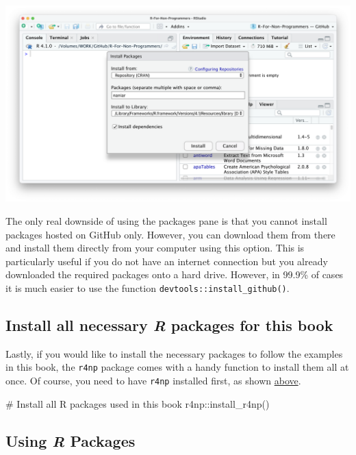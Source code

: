 \documentclass[
  letterpaper,
]{krantz}
\makeatletter
\newenvironment{Shaded}{\begin{snugshade}}{\end{snugshade}}
\newcommand{\CommentTok}[1]{\textcolor[rgb]{0.37,0.37,0.37}{#1}}
\newcommand{\FunctionTok}[1]{\textcolor[rgb]{0.28,0.35,0.67}{#1}}
\newcommand{\NormalTok}[1]{\textcolor[rgb]{0.00,0.23,0.31}{#1}}
\newcommand{\SpecialCharTok}[1]{\textcolor[rgb]{0.37,0.37,0.37}{#1}}
\newenvironment{kframe}{%
\medskip{}
\setlength{\fboxsep}{.8em}
 \def\at@end@of@kframe{}%
 \ifinner\ifhmode%
  \def\at@end@of@kframe{\end{minipage}}%
  \begin{minipage}{\columnwidth}%
 \fi\fi%
 \def\FrameCommand##1{\hskip\@totalleftmargin \hskip-\fboxsep
 \colorbox{shadecolor}{##1}\hskip-\fboxsep
     \hskip-\linewidth \hskip-\@totalleftmargin \hskip\columnwidth}%
 \MakeFramed {\advance\hsize-\width
   \@totalleftmargin\z@ \linewidth\hsize
   \@setminipage}}%
 {\par\unskip\endMakeFramed%
 \at@end@of@kframe}
\renewenvironment{Shaded}{\begin{kframe}}{\end{kframe}}
\makeatother
\begin{document}
\begin{enumerate}
  \includegraphics{images/chapter_05_img/install_r_packages/03_install_r_packages.png}
\end{enumerate}

The only real downside of using the packages pane is that you cannot
install packages hosted on GitHub only. However, you can download them
from there and install them directly from your computer using this
option. This is particularly useful if you do not have an internet
connection but you already downloaded the required packages onto a hard
drive. However, in 99.9\% of cases it is much easier to use the function
\texttt{devtools::install\_github()}.

\subsection{\texorpdfstring{Install all necessary \emph{R} packages for
this
book}{Install all necessary R packages for this book}}\label{sec-install-all-r-packages}

Lastly, if you would like to install the necessary packages to follow
the examples in this book, the \texttt{r4np} package comes with a handy
function to install them all at once. Of course, you need to have
\texttt{r4np} installed first, as shown \hyperref[install-r4np]{above}.

\begin{Shaded}
\begin{Highlighting}[]
\CommentTok{\# Install all R packages used in this book}
\NormalTok{r4np}\SpecialCharTok{::}\FunctionTok{install\_r4np}\NormalTok{()}
\end{Highlighting}
\end{Shaded}

\subsection{\texorpdfstring{Using \emph{R}
Packages}{Using R Packages}}\label{sec-using-r-packages}
\end{document}
